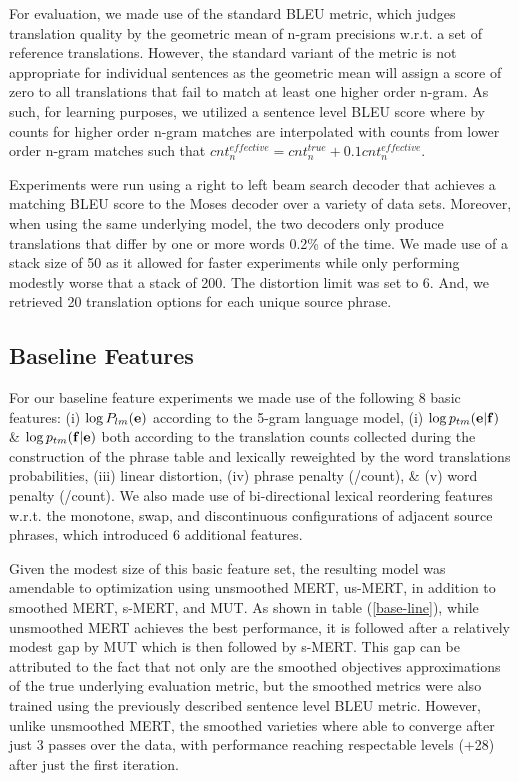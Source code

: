 \documentclass[11pt]{article}
\begin{document}
For evaluation, we made use of the standard BLEU metric\cite{kishore2002}, which judges translation quality by the geometric mean of n-gram precisions w.r.t. a set of reference translations. However, the standard variant of the metric is not appropriate for individual sentences as the geometric mean will assign a score of zero to all translations that fail to match at least one higher order n-gram. As such, for learning purposes, we utilized a sentence level BLEU score where by counts for higher order n-gram matches are interpolated with counts from lower order n-gram matches such that $cnt^{effective}_n = cnt^{true}_n + 0.1 cnt^{effective}_n$. 


Experiments were run using a right to left beam search decoder that achieves a matching BLEU score to the Moses decoder\cite{koehn2007} over a variety of data sets. Moreover, when using the same underlying model, the two decoders only produce translations that differ by one or more words 0.2\% of the time. We made use of a stack size of 50 as it allowed for faster experiments while only performing modestly worse that a stack of 200. The distortion limit was set to 6. And, we retrieved 20 translation options for each unique source phrase.

\subsection{Baseline Features}

For our baseline feature experiments we made use of the following 8 basic features: (i) $\log P_{lm}({\bf e})$ according to the 5-gram language model, (i) $\log p_{tm}({\bf e} | {\bf f})$ \& $\log p_{tm}({\bf f} | {\bf e})$ both according to the translation counts collected during the construction of the phrase table and lexically reweighted by the word translations probabilities, (iii) linear distortion, (iv) phrase penalty (/count), \& (v)  word penalty (/count). We also made use of bi-directional lexical reordering features w.r.t. the monotone, swap, and discontinuous configurations of adjacent source phrases, which introduced 6 additional features. 

Given the modest size of this basic feature set, the resulting model was amendable to optimization using unsmoothed MERT, us-MERT, in addition to smoothed MERT, s-MERT, and MUT. As shown in table (\ref{base-line}), while unsmoothed MERT achieves the best performance, it is followed after a relatively modest gap by MUT which is then followed by s-MERT. This gap can be attributed to the fact that not only are the smoothed objectives approximations of the true underlying evaluation metric, but the smoothed metrics were also trained using the previously described sentence level BLEU metric. However, unlike unsmoothed MERT, the smoothed varieties where able to converge after just 3 passes over the data, with performance reaching respectable levels (+28) after just the first iteration.
\end{document}
